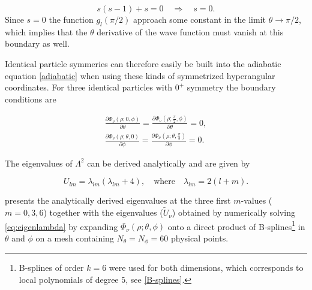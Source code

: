 \begin{equation}
s(s-1)+s = 0 \quad \Rightarrow \quad s=0.
\end{equation}
Since $s=0$ the function $g_l(\pi/2)$ approach some constant in the limit $\theta \rightarrow \pi/2$, which implies that the $\theta$ derivative of the wave function must vanish at this boundary as well.

Identical particle symmeries can therefore easily be built into the adiabatic equation \eqref{adiabatic} when using these kinds of symmetrized hyperangular coordinates. For three identical particles with $0^+$ symmetry the boundary conditions are  

\begin{align}
\frac{\partial\Phi_{\nu}(\rho;0,\phi)}{\partial \theta} = \frac{\partial\Phi_{\nu}(\rho;\frac{\pi}{2},\phi)}{\partial \theta} = 0,\\
\frac{\partial\Phi_{\nu}(\rho;\theta,0)}{\partial \phi} = \frac{\partial\Phi_{\nu}(\rho;\theta,\frac{\pi}{3})}{\partial \phi} = 0.
\end{align}

The eigenvalues of  $\Lambda^2$ can be derived analytically and are given by

\begin{equation}
U_{lm} = \lambda_{lm}(\lambda_{lm} + 4), \quad \text{where} \quad \lambda_{lm}=2(l+m).
\end{equation}

 presents the analytically derived eigenvalues at the three first $m$-values ($m=0,3,6$) together with the eigenvalues ($\tilde{U}_{\nu}$) obtained by numerically solving \eqref{eq:eigenlambda} by expanding $\Phi_{\nu}(\rho;\theta,\phi)$ onto a direct product of B-splines\footnote{B-splines of order $k=6$ were used for both dimensions, which corresponds to local polynomials of degree $5$, see \cref{B-splines}.} in $\theta$ and $\phi$ on a mesh containing $N_{\theta}=N_{\phi}=60$ physical points.

